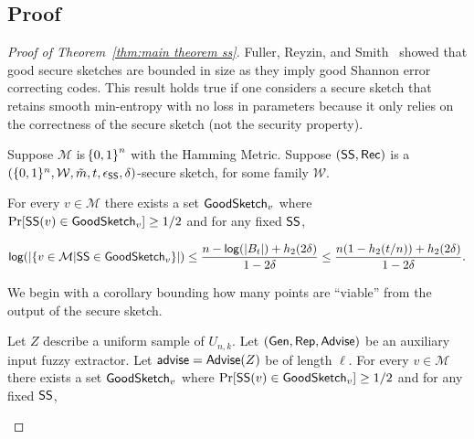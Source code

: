 \subsection{Proof}
\begin{proof}[Proof of Theorem~\ref{thm:main theorem ss}]
Fuller, Reyzin, and Smith~\cite[Lemma 7.3]{fuller2020fuzzy} showed that good secure sketches are bounded in size as they imply good Shannon error correcting codes.  This result holds true if one considers a secure sketch that retains smooth min-entropy with no loss in parameters because it only relies on the correctness of the secure sketch (not the security property).  

\begin{lemma}
\label{lem:smallgeneralviable ss}
    Suppose $\mathcal{M}$ is $\!\left\{ 0,1 \right\}^{n}$ with the Hamming Metric. Suppose $({\mathsf{SS}}, {\mathsf{Rec}})$ is a $(\{0, 1\}^n, \mathcal{W}, \tilde{m}, t, \epsilon_{\mathsf{SS}}, \delta)$-secure sketch, for some family $\mathcal{W}$. 
    
   For every $v\in \mathcal{M}$ there exists a set $\mathsf{GoodSketch}_v$ where $\Pr[{\mathsf{SS}}(v)\in \mathsf{GoodSketch}_v] \ge 1/2$ and for any fixed ${\mathsf{SS}}$,
    
    \[
    \mathsf{log}\!\left(|\{v \in \mathcal{M} | {\mathsf{SS}} \in \mathsf{GoodSketch}_v\}|\right) \le \frac{n - \mathsf{log}\!\left(|B_t|\right) +h_2(2\delta)}{1-2\delta} \le \frac{n(1-h_2(t/n)) +h_2(2\delta)}{1-2\delta}.
    \]
\end{lemma}


We begin with a corollary bounding how many points are ``viable'' from the output of the secure sketch.


\begin{corollary}
\label{corollary:info loss ss}
Let $Z$ describe a uniform sample of $U_{n,k}$.  Let $({\mathsf{Gen}}, {\mathsf{Rep}}, {\mathsf{Advise}})$ be an auxiliary input fuzzy extractor.  Let ${\mathsf{advise}} = {\mathsf{Advise}}(Z)$ be of length $\ell$.       For every $v\in \mathcal{M}$ there exists a set $\mathsf{GoodSketch}_v$ where $\Pr[{\mathsf{SS}}(v)\in \mathsf{GoodSketch}_v] \ge 1/2$ and for any fixed ${\mathsf{SS}}$,
    

\end{corollary}
\end{proof}
